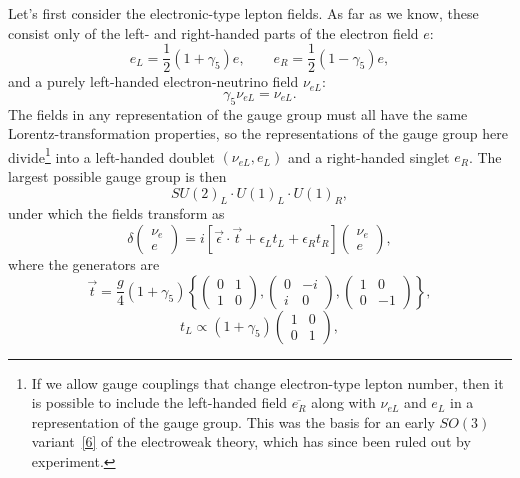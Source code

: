Let's first consider the electronic-type lepton fields. As far as we know, these consist only of the left- and right-handed parts of the electron field $e$:
\begin{equation}
e_L=\frac{1}{2}(1+\gamma_5)e,
\qquad
e_R=\frac{1}{2}(1-\gamma_5)e,
\tag{21.3.1}\label{eq:21.3.1}
\end{equation}
and a purely left-handed electron-neutrino field $\nu_{eL}$:
\begin{equation}
\gamma_5\nu_{eL}=\nu_{eL}.
\tag{21.3.2}\label{eq:21.3.2}
\end{equation}
The fields in any representation of the gauge group must all have the same Lorentz-transformation properties, so the representations of the gauge group here divide\footnote{If we allow gauge couplings that change electron-type lepton number, then it is possible to include the left-handed field $\overline{e_R}$ along with $\nu_{eL}$ and $e_L$ in a representation of the gauge group. This was the basis for an early $SO(3)$ variant~\hyperref[ch21-ref-6]{[6]} of the electroweak theory, which has since been ruled out by experiment.} into a left-handed doublet $(\nu_{eL},e_L)$ and a right-handed singlet $e_R$. The largest possible gauge group is then
\[
SU(2)_L\cdot U(1)_L\cdot U(1)_R,
\]
under which the fields transform as
\begin{equation}
\delta
\begin{pmatrix}
\nu_e\\ e
\end{pmatrix}
=i\left[\vec{\epsilon}\cdot\vec{t}+\epsilon_Lt_L+\epsilon_Rt_R\right]
\begin{pmatrix}
\nu_e\\ e
\end{pmatrix},
\tag{21.3.3}\label{eq:21.3.3}
\end{equation}
where the generators are
\begin{equation}
\vec{t}
=\frac{g}{4}(1+\gamma_5)
\left\{
\begin{pmatrix}0&1\\1&0\end{pmatrix},
\begin{pmatrix}0&-i\\i&0\end{pmatrix},
\begin{pmatrix}1&0\\0&-1\end{pmatrix}
\right\},
\tag{21.3.4}\label{eq:21.3.4}
\end{equation}
\begin{equation}
t_L\propto(1+\gamma_5)
\begin{pmatrix}1&0\\0&1\end{pmatrix},
\tag{21.3.5}\label{eq:21.3.5}
\end{equation}
